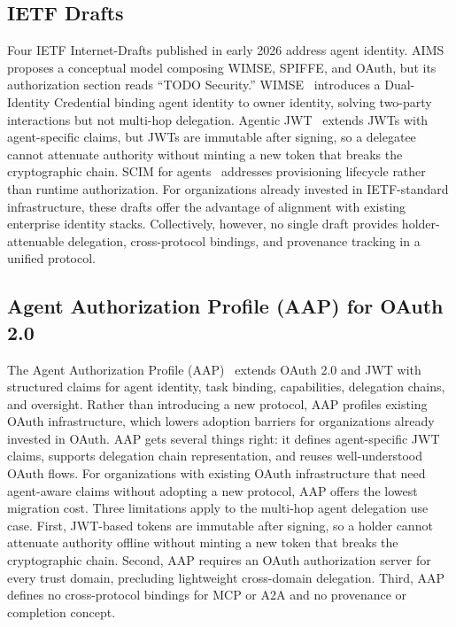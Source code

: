 \documentclass[11pt,a4paper]{article}
\begin{document}
\subsection{IETF Drafts}
\label{sec:ietf}

Four IETF Internet-Drafts published in early 2026 address agent identity. AIMS~\citep{ietf2026aims} proposes a conceptual model composing WIMSE, SPIFFE, and OAuth, but its authorization section reads ``TODO Security.'' WIMSE~\citep{ietf2026wimse} introduces a Dual-Identity Credential binding agent identity to owner identity, solving two-party interactions but not multi-hop delegation. Agentic JWT~\citep{ietf2026agenticjwt} extends JWTs with agent-specific claims, but JWTs are immutable after signing, so a delegatee cannot attenuate authority without minting a new token that breaks the cryptographic chain. SCIM for agents~\citep{ietf2026scim} addresses provisioning lifecycle rather than runtime authorization. For organizations already invested in IETF-standard infrastructure, these drafts offer the advantage of alignment with existing enterprise identity stacks. Collectively, however, no single draft provides holder-attenuable delegation, cross-protocol bindings, and provenance tracking in a unified protocol.

\subsection{Agent Authorization Profile (AAP) for OAuth 2.0}
\label{sec:aap}

The Agent Authorization Profile (AAP)~\citep{ietf2026aap} extends OAuth 2.0 and JWT with structured claims for agent identity, task binding, capabilities, delegation chains, and oversight. Rather than introducing a new protocol, AAP profiles existing OAuth infrastructure, which lowers adoption barriers for organizations already invested in OAuth. AAP gets several things right: it defines agent-specific JWT claims, supports delegation chain representation, and reuses well-understood OAuth flows. For organizations with existing OAuth infrastructure that need agent-aware claims without adopting a new protocol, AAP offers the lowest migration cost. Three limitations apply to the multi-hop agent delegation use case. First, JWT-based tokens are immutable after signing, so a holder cannot attenuate authority offline without minting a new token that breaks the cryptographic chain. Second, AAP requires an OAuth authorization server for every trust domain, precluding lightweight cross-domain delegation. Third, AAP defines no cross-protocol bindings for MCP or A2A and no provenance or completion concept.
\end{document}

